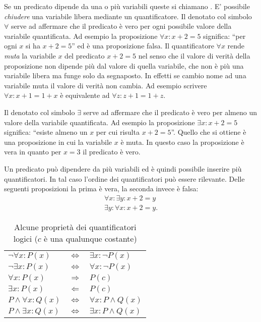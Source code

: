 Se un predicato dipende da una o più variabili queste
si chiamano . E' possibile
\emph{chiudere} una variabile libera mediante un quantificatore.
Il  denotato col simbolo
$\forall$ serve ad affermare che il predicato è vero
per ogni possibile valore della variabile quantificata.
Ad esempio la proposizione $\forall x\colon x+2=5$ significa:
``per ogni $x$ si ha $x+2=5$'' ed è una proposizione falsa.
Il quantificatore $\forall x$ rende \emph{muta} la variabile
$x$ del predicato $x+2=5$ nel senso che il valore di verità 
della proposizione
non dipende più dal valore di quella variabile, che non è
più una variabile libera ma funge solo da segnaposto.
In effetti se cambio nome ad una variabile muta il valore 
di verità non cambia. Ad esempio scrivere $\forall x\colon x+1=1+x$
è equivalente ad $\forall z\colon z+1=1+z$.

Il  denotato col simbolo
$\exists$ serve ad affermare che il predicato è vero per
almeno un valore della variabile quantificata.
Ad esempio la proposizione $\exists x\colon x+2=5$ significa:
``esiste almeno un $x$ per cui risulta $x+2=5$''.
Quello che si ottiene è una proposizione in cui la variabile
$x$ è muta. In questo caso la proposizione è vera in quanto
per $x=3$ il predicato è vero.

Un predicato può dipendere da più variabili ed è quindi
possibile inserire più quantificatori. In tal caso l'ordine
dei quantificatori può essere rilevante.
Delle seguenti proposizioni la prima è vera, la seconda
invece è falsa:
\begin{gather*}
\forall x\colon \exists y\colon x+2=y \\
\exists y\colon \forall x\colon x+2=y.
\end{gather*}

\begin{table}
\begin{center}
\begin{tabular}{lcl}
$\lnot \forall x \colon P(x)$ & $\iff$ & $\exists x \colon \lnot P(x)$\\
$\lnot \exists x \colon P(x)$ & $\iff$ & $\forall x \colon \lnot P(x)$\\
$\forall x \colon P(x)$ & $\Longrightarrow$ & $P(c)$\\
$\exists x \colon P(x)$ & $\Longleftarrow$ & $P(c)$\\
$P \land \forall x \colon Q(x)$ & $\iff$ & $\forall x\colon P\land Q(x)$\\
$P \land \exists x \colon Q(x)$ & $\iff$ & $\exists x \colon P \land Q(x)$
\end{tabular}
\end{center}
\caption{Alcune proprietà dei quantificatori logici ($c$ è una qualunque costante)}
\label{tab:proprieta_quantificatori}
\end{table}

